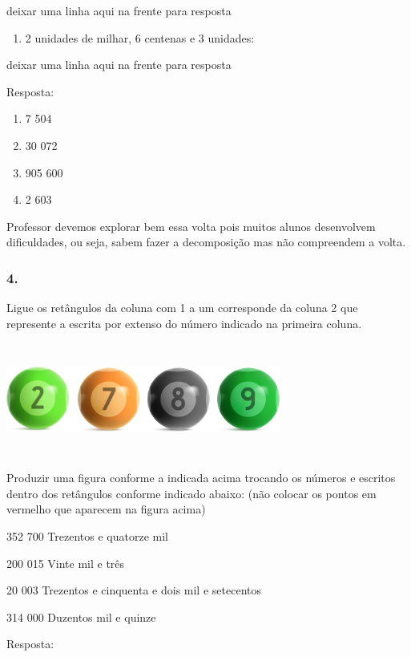 deixar uma linha aqui na frente para resposta

\begin{enumerate}
\def\labelenumi{\alph{enumi})}
\item
  2 unidades de milhar, 6 centenas e 3 unidades:
\end{enumerate}

deixar uma linha aqui na frente para resposta

Resposta:

\begin{enumerate}
\def\labelenumi{\alph{enumi})}
\item
  7 504
\item
  30 072
\item
  905 600
\item
  2 603
\end{enumerate}

Professor devemos explorar bem essa volta pois muitos alunos desenvolvem
dificuldades, ou seja, sabem fazer a decomposição mas não compreendem a
volta.

\subsubsection{4.}\label{section-3}

Ligue os retângulos da coluna com 1 a um corresponde da coluna 2 que
represente a escrita por extenso do número indicado na primeira coluna.

\includegraphics[width=3.55128in,height=1.46056in]{media/image7.png}

Produzir uma figura conforme a indicada acima trocando os números e
escritos dentro dos retângulos conforme indicado abaixo: (não colocar os
pontos em vermelho que aparecem na figura acima)

352 700 Trezentos e quatorze mil

200 015 Vinte mil e três

20 003 Trezentos e cinquenta e dois mil e setecentos

314 000 Duzentos mil e quinze

Resposta:


